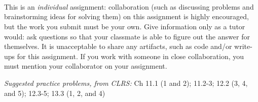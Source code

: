 \documentclass[letterpaper,11pt]{article}
\begin{document}


 \\

 \\
 \\

This is an \emph{individual} assignment: collaboration (such as discussing problems and brainstorming ideas for solving them) on this assignment is highly encouraged, but the work you submit must be your own. Give information only as a tutor would: ask questions so that your classmate is able to figure out the answer for themselves. It is unacceptable to share any artifacts, such as code and/or write-ups for this assignment. If you work with someone in close collaboration, you must mention your collaborator on your assignment.

\emph{Suggested practice problems, from CLRS:} Ch 11.1 (1 and 2); 11.2-3; 12.2 (3, 4, and 5); 12.3-5; 13.3 (1, 2, and 4) 
\end{document}
